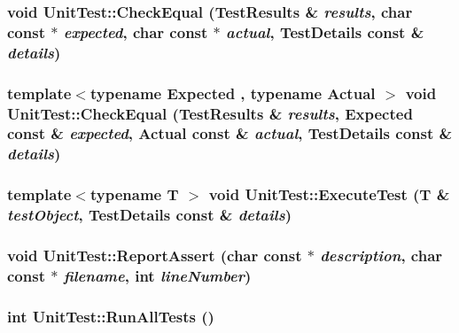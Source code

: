 \hypertarget{namespace_unit_test_a1d95c47467cdc478fd4a3310060c62e}{
\subsubsection[{CheckEqual}]{\setlength{\rightskip}{0pt plus 5cm}void UnitTest::CheckEqual (TestResults \& {\em results}, \/  char const $\ast$ {\em expected}, \/  char const $\ast$ {\em actual}, \/  TestDetails const \& {\em details})}}
\label{namespace_unit_test_a1d95c47467cdc478fd4a3310060c62e}


\hypertarget{namespace_unit_test_da1d55be7d7f0be93e7e18b7153306bb}{
\subsubsection[{CheckEqual}]{\setlength{\rightskip}{0pt plus 5cm}template$<$typename Expected , typename Actual $>$ void UnitTest::CheckEqual (TestResults \& {\em results}, \/  Expected const \& {\em expected}, \/  Actual const \& {\em actual}, \/  TestDetails const \& {\em details})}}
\label{namespace_unit_test_da1d55be7d7f0be93e7e18b7153306bb}


\hypertarget{namespace_unit_test_ef3cc9905021eb7ee6909a1bfd156bc5}{
\subsubsection[{ExecuteTest}]{\setlength{\rightskip}{0pt plus 5cm}template$<$typename T $>$ void UnitTest::ExecuteTest (T \& {\em testObject}, \/  TestDetails const \& {\em details})}}
\label{namespace_unit_test_ef3cc9905021eb7ee6909a1bfd156bc5}


\hypertarget{namespace_unit_test_891668df864d7e73585fa7699398ee07}{
\subsubsection[{ReportAssert}]{\setlength{\rightskip}{0pt plus 5cm}void UnitTest::ReportAssert (char const $\ast$ {\em description}, \/  char const $\ast$ {\em filename}, \/  int {\em lineNumber})}}
\label{namespace_unit_test_891668df864d7e73585fa7699398ee07}


\hypertarget{namespace_unit_test_00270e02336149dfb00bf0374587521c}{
\subsubsection[{RunAllTests}]{\setlength{\rightskip}{0pt plus 5cm}int UnitTest::RunAllTests ()}}
\label{namespace_unit_test_00270e02336149dfb00bf0374587521c}


